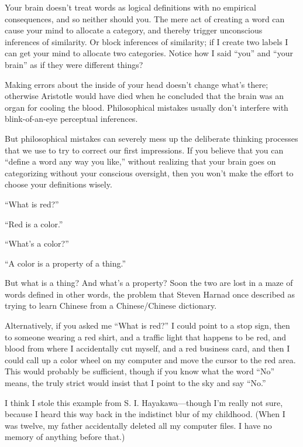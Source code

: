 {
 Your brain doesn't treat words as logical
definitions with no empirical consequences, and so neither should you.
The mere act of creating a word can cause your mind to allocate a
category, and thereby trigger unconscious inferences of similarity. Or
block inferences of similarity; if I create two labels I can get your
mind to allocate two categories. Notice how I said
``you'' and ``your
brain'' as if they were different things?}

{
 Making errors about the inside of your head
doesn't change what's there; otherwise
Aristotle would have died when he concluded that the brain was an organ
for cooling the blood. Philosophical mistakes usually
don't interfere with blink-of-an-eye perceptual
inferences.}

{
 But philosophical mistakes can severely mess up the deliberate
thinking processes that we use to try to correct our first impressions.
If you believe that you can ``define a word any way
you like,'' without realizing that your brain goes on
categorizing without your conscious oversight, then you
won't make the effort to choose your definitions
wisely.}

\myendsectiontext


{
 ``What is red?''}

{
 ``Red is a color.''}

{
 ``What's a
color?''}

{
 ``A color is a property of a
thing.''}

{
 But what is a thing? And what's a property? Soon
the two are lost in a maze of words defined in other words, the problem
that Steven Harnad once described as trying to learn Chinese from a
Chinese/Chinese dictionary.}

{
 Alternatively, if you asked me ``What is
red?'' I could point to a stop sign, then to someone
wearing a red shirt, and a traffic light that happens to be red, and
blood from where I accidentally cut myself, and a red business card,
and then I could call up a color wheel on my computer and move the
cursor to the red area. This would probably be sufficient, though if
you know what the word ``No'' means,
the truly strict would insist that I point to the sky and say
``No.''}

{
 I think I stole this example from S. I. Hayakawa---though
I'm really not sure, because I heard this way back in
the indistinct blur of my childhood. (When I was twelve, my father
accidentally deleted all my computer files. I have no memory of
anything before that.)}

